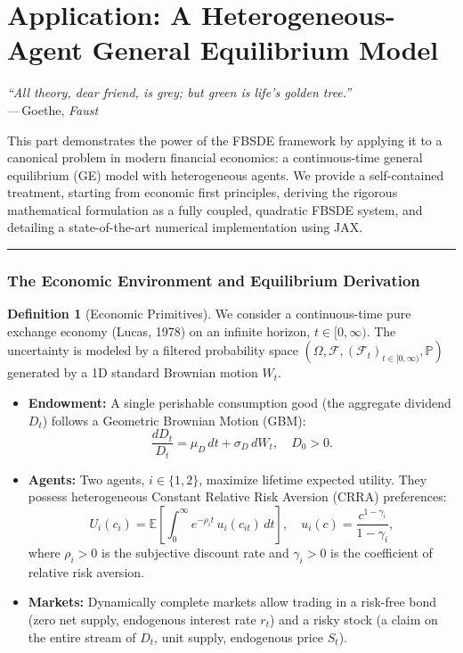 \documentclass[11pt,letterpaper,oneside]{article}
\theoremstyle{plain}
\theoremstyle{definition}
\newtheorem{definition}[theorem]{Definition}
\theoremstyle{remark}
\begin{document}
\clearpage
\newpage
\part{Application: A Heterogeneous-Agent General Equilibrium Model}
\label{part:finance}

\begin{center}
\textit{“All theory, dear friend, is grey; but green is life's golden tree.”}\\
—\,Goethe, \emph{Faust}
\end{center}

This part demonstrates the power of the FBSDE framework by applying it to a canonical problem in modern financial economics: a continuous-time general equilibrium (GE) model with heterogeneous agents. We provide a self-contained treatment, starting from economic first principles, deriving the rigorous mathematical formulation as a fully coupled, quadratic FBSDE system, and detailing a state-of-the-art numerical implementation using JAX.

\bigskip
\hrule
\bigskip

\section{The Economic Environment and Equilibrium Derivation}
\label{sec:lucas_spec_new}

\begin{definition}[Economic Primitives]
We consider a continuous-time pure exchange economy (Lucas, 1978) on an infinite horizon, \(t \in [0, \infty)\). The uncertainty is modeled by a filtered probability space \((\Omega,\mathcal F,(\mathcal F_t)_{t \in [0,\infty)},\mathbb P)\) generated by a 1D standard Brownian motion \(W_t\).
\begin{itemize}[leftmargin=1.6em]
\item \textbf{Endowment:} A single perishable consumption good (the aggregate dividend \(D_t\)) follows a Geometric Brownian Motion (GBM):
    \begin{equation}\label{eq:dividend_SDE_new_main}
      \frac{dD_t}{D_t} = \mu_D\,dt + \sigma_D\,dW_t, \quad D_0 > 0.
    \end{equation}
\item \textbf{Agents:} Two agents, \(i \in \{1, 2\}\), maximize lifetime expected utility. They possess heterogeneous Constant Relative Risk Aversion (CRRA) preferences:
    \begin{equation}\label{eq:utility_new_main}
      U_i(c_i) = \mathbb{E}\left[\int_0^\infty e^{-\rho_i t}\, u_i(c_{it})\,dt\right], \quad u_i(c) = \frac{c^{1-\gamma_i}}{1-\gamma_i},
    \end{equation}
    where \(\rho_i>0\) is the subjective discount rate and \(\gamma_i>0\) is the coefficient of relative risk aversion.
\item \textbf{Markets:} Dynamically complete markets allow trading in a risk-free bond (zero net supply, endogenous interest rate \(r_t\)) and a risky stock (a claim on the entire stream of \(D_t\), unit supply, endogenous price \(S_t\)).
\end{itemize}
\end{definition}
\end{document}
